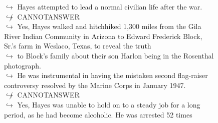 \documentclass[11pt,a4paper, onecolumn]{article}
\begin{document}
\begin{figure}[t] \small \begin{tcolorbox}[boxsep=0pt,left=5pt,right=0pt,top=2pt,colback = yellow!5] \begin{dialogue}
 \small 
\colorbox{pink!25}{$\hookrightarrow$}
{ Hayes attempted to lead a normal civilian life after the war. }
\\
\colorbox{pink!25}{$\not\hookrightarrow$}
{ CANNOTANSWER }
\\
\colorbox{pink!25}{$\hookrightarrow$}
\colorbox{red!25}{Yes,}
{ Hayes walked and hitchhiked 1,300 miles from the Gila River Indian Community in Arizona to Edward Frederick Block, Sr.'s farm in Weslaco, Texas, to reveal the truth }
\\
\colorbox{pink!25}{$\hookrightarrow$}
{ to Block's family about their son Harlon being in the Rosenthal photograph. }
\\
\colorbox{pink!25}{$\hookrightarrow$}
{ He was instrumental in having the mistaken second flag-raiser controversy resolved by the Marine Corps in January 1947. }
\\
\colorbox{pink!25}{$\not\hookrightarrow$}
{ CANNOTANSWER }
\\
\colorbox{pink!25}{$\hookrightarrow$}
\colorbox{red!25}{Yes,}
{ Hayes was unable to hold on to a steady job for a long period, as he had become alcoholic. He was arrested 52 times }
\\
 \end{dialogue}\end{tcolorbox}\end{figure}
\end{document}
